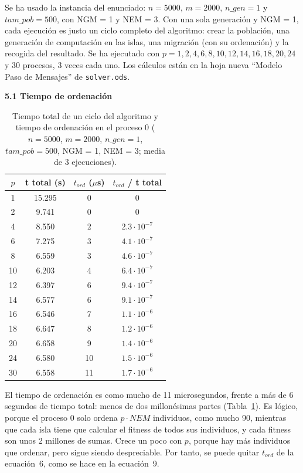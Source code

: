 \documentclass[12pt]{article}
\begin{document}
\begin{enumerate}
Se ha usado la instancia del enunciado: $n = 5000$, $m = 2000$, $n\_gen = 1$ y $tam\_pob = 500$, con NGM = 1 y NEM = 3. Con una sola generación y NGM = 1, cada ejecución es justo un ciclo completo del algoritmo: crear la población, una generación de computación en las islas, una migración (con su ordenación) y la recogida del resultado. Se ha ejecutado con $p = 1, 2, 4, 6, 8, 10, 12, 14, 16, 18, 20, 24$ y 30 procesos, 3 veces cada uno. Los cálculos están en la hoja nueva ``Modelo Paso de Mensajes'' de \texttt{solver.ods}.

\medskip
\noindent\textbf{5.1 Tiempo de ordenación}\par
\smallskip

\begin{table}[htbp]
\centering
\begin{tabular}{c|ccc}
\toprule
\textbf{$p$} & \textbf{t total (s)} & \textbf{$t_{ord}$ ($\mu$s)} & \textbf{$t_{ord}$ / t total} \\
\midrule
1 & 15.295 & 0 & 0 \\
2 & 9.741 & 0 & 0 \\
4 & 8.550 & 2 & $2.3 \cdot 10^{-7}$ \\
6 & 7.275 & 3 & $4.1 \cdot 10^{-7}$ \\
8 & 6.559 & 3 & $4.6 \cdot 10^{-7}$ \\
10 & 6.203 & 4 & $6.4 \cdot 10^{-7}$ \\
12 & 6.397 & 6 & $9.4 \cdot 10^{-7}$ \\
14 & 6.577 & 6 & $9.1 \cdot 10^{-7}$ \\
16 & 6.546 & 7 & $1.1 \cdot 10^{-6}$ \\
18 & 6.647 & 8 & $1.2 \cdot 10^{-6}$ \\
20 & 6.658 & 9 & $1.4 \cdot 10^{-6}$ \\
24 & 6.580 & 10 & $1.5 \cdot 10^{-6}$ \\
30 & 6.558 & 11 & $1.7 \cdot 10^{-6}$ \\
\bottomrule
\end{tabular}
\caption{Tiempo total de un ciclo del algoritmo y tiempo de ordenación en el proceso 0 ($n = 5000$, $m = 2000$, $n\_gen = 1$, $tam\_pob = 500$, NGM = 1, NEM = 3; media de 3 ejecuciones).}
\label{tab:c5_tord}
\end{table}

El tiempo de ordenación es como mucho de 11 microsegundos, frente a más de 6 segundos de tiempo total: menos de dos millonésimas partes (Tabla~\ref{tab:c5_tord}). Es lógico, porque el proceso 0 solo ordena $p \cdot NEM$ individuos, como mucho 90, mientras que cada isla tiene que calcular el fitness de todos sus individuos, y cada fitness son unos 2 millones de sumas. Crece un poco con $p$, porque hay más individuos que ordenar, pero sigue siendo despreciable. Por tanto, se puede quitar $t_{ord}$ de la ecuación~6, como se hace en la ecuación~9.


\end{enumerate}
\end{document}
